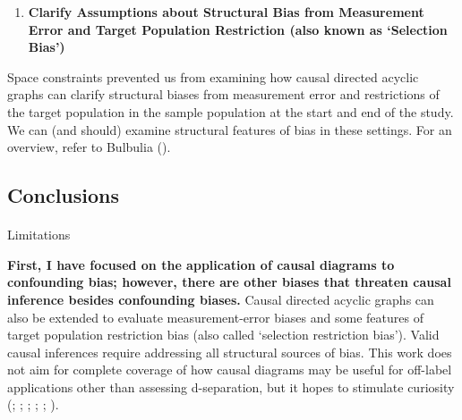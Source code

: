 \documentclass[
  single column]{article}
\makeatletter
\let\oldparagraph\paragraph
\renewcommand{\paragraph}{
    \@ifstar
      \xxxParagraphStar
      \xxxParagraphNoStar
  }
\newcommand{\xxxParagraphStar}[1]{\oldparagraph*{#1}\mbox{}}
\newcommand{\xxxParagraphNoStar}[1]{\oldparagraph{#1}\mbox{}}
\providecommand{\tightlist}{%
  \setlength{\itemsep}{0pt}\setlength{\parskip}{0pt}}\usepackage{longtable,booktabs,array}
\makeatother
\begin{document}
\begin{enumerate}
\def\labelenumi{\arabic{enumi}.}
\setcounter{enumi}{11}
\tightlist
\item
  \textbf{Clarify Assumptions about Structural Bias from Measurement
  Error and Target Population Restriction (also known as `Selection
  Bias')}
\end{enumerate}

Space constraints prevented us from examining how causal directed
acyclic graphs can clarify structural biases from measurement error and
restrictions of the target population in the sample population at the
start and end of the study. We can (and should) examine structural
features of bias in these settings. For an overview, refer to Bulbulia
().

\subsection{Conclusions}\label{id-sec-6}

\paragraph{Limitations}\label{limitations}

\textbf{First, I have focused on the application of causal diagrams to
confounding bias; however, there are other biases that threaten causal
inference besides confounding biases.} Causal directed acyclic graphs
can also be extended to evaluate measurement-error biases and some
features of target population restriction bias (also called `selection
restriction bias'). Valid causal inferences require addressing all
structural sources of bias. This work does not aim for complete coverage
of how causal diagrams may be useful for off-label applications other
than assessing d-separation, but it hopes to stimulate curiosity
(;
;
;
;
;
).
\end{document}

